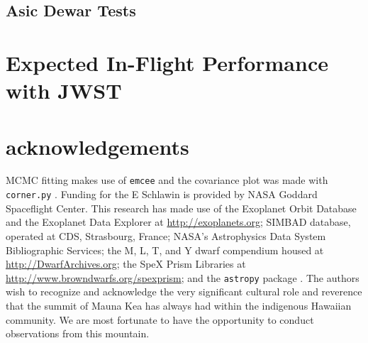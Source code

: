 \documentclass{aastex62}
\begin{document}
{\subsection{Asic Dewar Tests}

\acknowledgments

\section{Expected In-Flight Performance with JWST}

\section*{acknowledgements}
MCMC fitting makes use of \texttt{emcee} \citep{foreman-mackey2013emcee} and the covariance plot was made with \texttt{corner.py} \citep{foremanCorner}.
Funding for the E Schlawin is provided by NASA Goddard Spaceflight Center.
This research has made
use of the Exoplanet Orbit Database and the Exoplanet Data Explorer at \url{http://exoplanets.org}; SIMBAD database, operated at CDS, Strasbourg,
France; NASA's Astrophysics Data System Bibliographic
Services; the M, L, T, and Y dwarf compendium
housed at \url{http://DwarfArchives.org}; the SpeX Prism
Libraries at \url{http://www.browndwarfs.org/spexprism}; and the \texttt{astropy} package \citep{astropy2013}. 
The authors wish to recognize and acknowledge the very significant cultural role and reverence that the summit of Mauna Kea has always had within the indigenous Hawaiian community. We are most fortunate to have the opportunity to conduct observations from this mountain.

%

\vspace{5mm}


}
\end{document}
